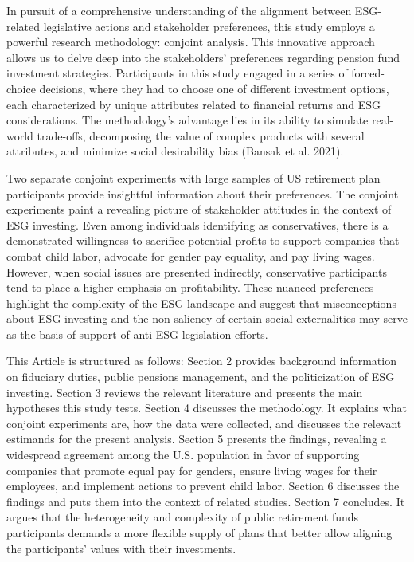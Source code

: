 \documentclass[
  12pt,
]{article}
\begin{document}
In pursuit of a comprehensive understanding of the alignment between ESG-related legislative actions and stakeholder preferences, this study employs a powerful research methodology: conjoint analysis. This innovative approach allows us to delve deep into the stakeholders' preferences regarding pension fund investment strategies. Participants in this study engaged in a series of forced-choice decisions, where they had to choose one of different investment options, each characterized by unique attributes related to financial returns and ESG considerations. The methodology's advantage lies in its ability to simulate real-world trade-offs, decomposing the value of complex products with several attributes, and minimize social desirability bias (Bansak et al. 2021).

Two separate conjoint experiments with large samples of US retirement plan participants provide insightful information about their preferences. The conjoint experiments paint a revealing picture of stakeholder attitudes in the context of ESG investing. Even among individuals identifying as conservatives, there is a demonstrated willingness to sacrifice potential profits to support companies that combat child labor, advocate for gender pay equality, and pay living wages. However, when social issues are presented indirectly, conservative participants tend to place a higher emphasis on profitability. These nuanced preferences highlight the complexity of the ESG landscape and suggest that misconceptions about ESG investing and the non-saliency of certain social externalities may serve as the basis of support of anti-ESG legislation efforts.

This Article is structured as follows: Section 2 provides background information on fiduciary duties, public pensions management, and the politicization of ESG investing. Section 3 reviews the relevant literature and presents the main hypotheses this study tests. Section 4 discusses the methodology. It explains what conjoint experiments are, how the data were collected, and discusses the relevant estimands for the present analysis. Section 5 presents the findings, revealing a widespread agreement among the U.S. population in favor of supporting companies that promote equal pay for genders, ensure living wages for their employees, and implement actions to prevent child labor. Section 6 discusses the findings and puts them into the context of related studies. Section 7 concludes. It argues that the heterogeneity and complexity of public retirement funds participants demands a more flexible supply of plans that better allow aligning the participants' values with their investments.
\end{document}
